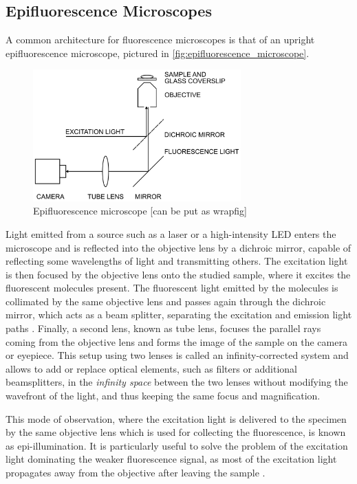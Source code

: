 \subsection{Epifluorescence Microscopes} \label{sec:epifluorescence_microscopes}
A common architecture for fluorescence microscopes is that of an upright epifluorescence microscope, pictured in \autoref{fig:epifluorescence_microscope}.
%
\begin{figure}[htbp]  
    \centering
    \includegraphics[width=8cm]{figures/epifluorescence-microscope.png}
    \caption{Epifluorescence microscope \cite{douglass_notice_2023} [can be put as wrapfig]}
    \label{fig:epifluorescence_microscope}
\end{figure}
%
Light emitted from a source such as a laser or a high-intensity LED enters the microscope and is reflected into the objective lens by a dichroic mirror, capable of reflecting some wavelengths of light and transmitting others.
The excitation light is then focused by the objective lens onto the studied sample, where it excites the fluorescent molecules present.
The fluorescent light emitted by the molecules is collimated by the same objective lens and passes again through the dichroic mirror, which acts as a beam splitter, separating the excitation and emission light paths \cite{sachl_introduction_2022}.
Finally, a second lens, known as tube lens, focuses the parallel rays coming from the objective lens and forms the image of the sample on the camera or eyepiece.
This setup using two lenses is called an infinity-corrected system and allows to add or replace optical elements, such as filters or additional beamsplitters, in the \emph{infinity space} between the two lenses  without modifying the wavefront of the light, and thus keeping the same focus and magnification.

This mode of observation, where the excitation light is delivered to the specimen by the same objective lens which is used for collecting the fluorescence, is known as epi-illumination.
It is particularly useful to solve the problem of the excitation light dominating the weaker fluorescence signal, as most of the excitation light propagates away from the objective after leaving the sample \cite{douglass_notice_2023}.

